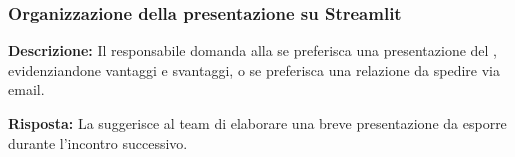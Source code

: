 \subsubsection{Organizzazione della presentazione su Streamlit}

\textbf{Descrizione:} Il responsabile domanda alla  se preferisca una presentazione del  , evidenziandone vantaggi e svantaggi, o se preferisca una relazione da spedire via email.

\textbf{Risposta:} La  suggerisce al team di elaborare una breve presentazione da esporre durante l'incontro successivo.